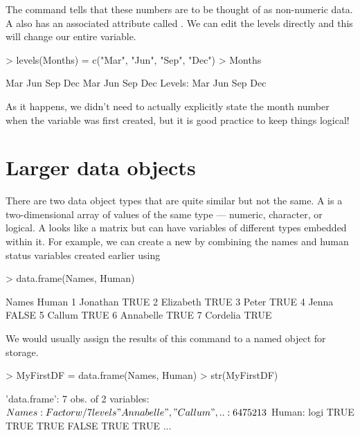 The  command tells \R{} that these numbers are to be thought of as non-numeric data. A  also has an associated attribute called . We can edit the levels directly and this will change our entire variable. \label{UseOfLevels} 

\begin{Schunk}
\begin{Sinput}
> levels(Months) = c("Mar", "Jun", "Sep", "Dec") 
> Months 
\end{Sinput}
\begin{Soutput}
[1] Mar Jun Sep Dec Mar Jun Sep Dec
Levels: Mar Jun Sep Dec
\end{Soutput}
\end{Schunk}

As it happens, we didn't need to actually explicitly state the month number when the variable was first created, but it is good practice to keep things logical! 
 
\section{Larger data objects} 
 
There are two data object types that are quite similar but not the same. A  is a two-dimensional array of values of the same type --- numeric, character, or logical. A  looks like a matrix but can have variables of different types embedded within it. For example, we can create a new  by combining the names and human status variables created earlier using 

\begin{Schunk}
\begin{Sinput}
> data.frame(Names, Human) 
\end{Sinput}
\begin{Soutput}
      Names Human
1  Jonathan  TRUE
2 Elizabeth  TRUE
3     Peter  TRUE
4     Jenna FALSE
5    Callum  TRUE
6 Annabelle  TRUE
7  Cordelia  TRUE
\end{Soutput}
\end{Schunk}

We would usually assign the results of this command to a named object for storage. 

\begin{Schunk}
\begin{Sinput}
> MyFirstDF = data.frame(Names, Human) 
> str(MyFirstDF) 
\end{Sinput}
\begin{Soutput}
'data.frame':	7 obs. of  2 variables:
 $ Names: Factor w/ 7 levels "Annabelle","Callum",..: 6 4 7 5 2 1 3
 $ Human: logi  TRUE TRUE TRUE FALSE TRUE TRUE ...
\end{Soutput}
\end{Schunk}

